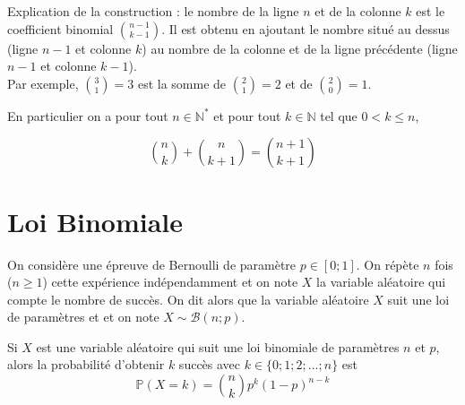 \documentclass[french]{book}
\begin{document}
\begin{rem}
Explication de la construction : le nombre de la ligne $n$ et de la colonne $k$ est le coefficient binomial $\binom{n-1}{k-1}$. Il est obtenu en ajoutant le nombre situé au dessus (ligne $n-1$ et colonne $k$) au nombre de la colonne et de la ligne précédente (ligne $n-1$ et colonne $k-1$).\\
Par exemple, $\binom{3}{1}=3$ est la somme de $\binom{2}{1}=2$ et de $\binom{2}{0}=1$.

\begin{center}
\end{center}

En particulier on a pour tout $n \in \mathbb{N}^*$ et pour tout $k \in \mathbb{N}$ tel que $0< k \leq n$,

$$ \binom{n}{k}+ \binom{n}{k+1}= \binom{n+1}{k+1}$$
\end{rem}

\section{Loi Binomiale}

\begin{defn}
On considère une épreuve de Bernoulli de paramètre $p\in [0;1]$. On répète $n$ fois ($n\geq 1$) cette expérience indépendamment et on note $X$ la variable aléatoire qui compte le nombre de succès. On dit alors que la variable aléatoire $X$ suit une loi  de paramètres  et   et on note $X\sim \mathcal{B}(n;p)$.
\end{defn}


\begin{prop}
 Si $X$ est une variable aléatoire qui suit une loi binomiale de paramètres $n$ et $p$, alors la probabilité d'obtenir $k$ succès avec $k\in\{0;1;2;...;n\}$ est 
$$\mathbb{P}(X=k)=\binom{n}{k}p^k(1-p)^{n-k}$$
\end{prop}
\end{document}
